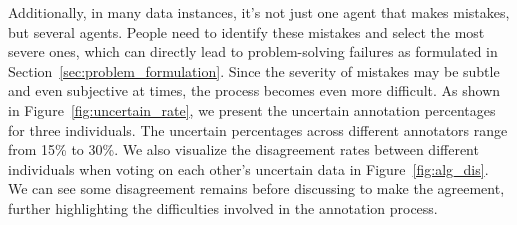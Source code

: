 Additionally, in many data instances, it's not just one agent that makes mistakes, but several agents. People need to identify these mistakes and select the most severe ones, which can directly lead to problem-solving failures as formulated in Section~\ref{sec:problem_formulation}. Since the severity of mistakes may be subtle and even subjective at times, the process becomes even more difficult. As shown in Figure~\ref{fig:uncertain_rate}, we present the uncertain annotation percentages for three individuals. The uncertain percentages across different annotators range from 15\% to 30\%. We also visualize the disagreement rates between different individuals when voting on each other's uncertain data in Figure~\ref{fig:alg_dis}. We can see some disagreement remains before discussing to make the agreement, further highlighting the difficulties involved in the annotation process.

